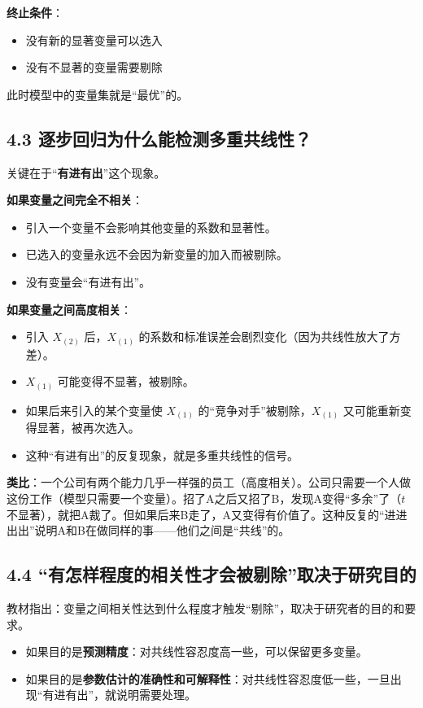 \documentclass[12pt,a4paper]{ctexart}
\begin{document}
\textbf{终止条件}：
\begin{itemize}
  \item 没有新的显著变量可以选入
  \item 没有不显著的变量需要剔除
\end{itemize}

此时模型中的变量集就是“最优”的。

\subsection*{4.3 逐步回归为什么能检测多重共线性？}

关键在于“\textbf{有进有出}”这个现象。

\textbf{如果变量之间完全不相关}：
\begin{itemize}
  \item 引入一个变量不会影响其他变量的系数和显著性。
  \item 已选入的变量永远不会因为新变量的加入而被剔除。
  \item 没有变量会“有进有出”。
\end{itemize}

\textbf{如果变量之间高度相关}：
\begin{itemize}
  \item 引入 $X_{(2)}$ 后，$X_{(1)}$ 的系数和标准误差会剧烈变化（因为共线性放大了方差）。
  \item $X_{(1)}$ 可能变得不显著，被剔除。
  \item 如果后来引入的某个变量使 $X_{(1)}$ 的“竞争对手”被剔除，$X_{(1)}$ 又可能重新变得显著，被再次选入。
  \item 这种“有进有出”的反复现象，就是多重共线性的信号。
\end{itemize}

\textbf{类比}：一个公司有两个能力几乎一样强的员工（高度相关）。公司只需要一个人做这份工作（模型只需要一个变量）。招了A之后又招了B，发现A变得“多余”了（$t$ 不显著），就把A裁了。但如果后来B走了，A又变得有价值了。这种反复的“进进出出”说明A和B在做同样的事——他们之间是“共线”的。

\subsection*{4.4 “有怎样程度的相关性才会被剔除”取决于研究目的}

教材指出：变量之间相关性达到什么程度才触发“剔除”，取决于研究者的目的和要求。
\begin{itemize}
  \item 如果目的是\textbf{预测精度}：对共线性容忍度高一些，可以保留更多变量。
  \item 如果目的是\textbf{参数估计的准确性和可解释性}：对共线性容忍度低一些，一旦出现“有进有出”，就说明需要处理。
\end{itemize}
\end{document}

